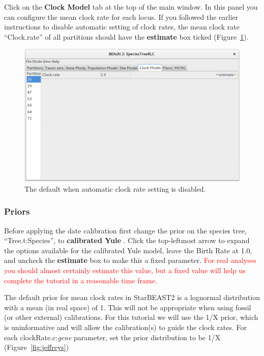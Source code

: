 \documentclass{article}
\begin{document}
Click on the \textbf{Clock Model} tab at the top of the main window. In this
panel you can configure the mean clock rate for each locus. If you followed the
earlier instructions to disable automatic setting of clock rates, the
mean clock rate ``Clock.rate'' of all partitions should have the
\textbf{estimate} box ticked (Figure~\ref{fig:clock}).

\begin{figure}[htb!]
\centering
\includegraphics[width=\textwidth]{figures/beauti-clock.png}
\caption{The default when automatic clock rate setting is disabled.}
\label{fig:clock}
\end{figure}

\clearpage

\subsubsection*{Priors}

Before applying the date calibration first change the prior on the species
tree, ``Tree.t:Species'', to \textbf{calibrated Yule} \citep{Heled01012012}.
Click the top-leftmost arrow to expand the options available for the
calibrated Yule model, leave the Birth Rate at 1.0, and uncheck the
\textbf{estimate} box to make this a fixed parameter. \textcolor{red}{For real
analyses you should almost certainly estimate this value, but a fixed value
will help us complete the tutorial in a reasonable time frame.}

The default prior for mean clock rates in StarBEAST2 is a lognormal
distribution with a mean (in real space) of 1. This will not be appropriate
when using fossil (or other external) calibrations. For this tutorial we will
use the 1/X prior, which is uninformative and will allow the calibration(s) to
guide the clock rates. For each clockRate.c:\textit{gene} parameter, set
the prior distribution to be 1/X (Figure~\ref{fig:jeffreys})
\end{document}
